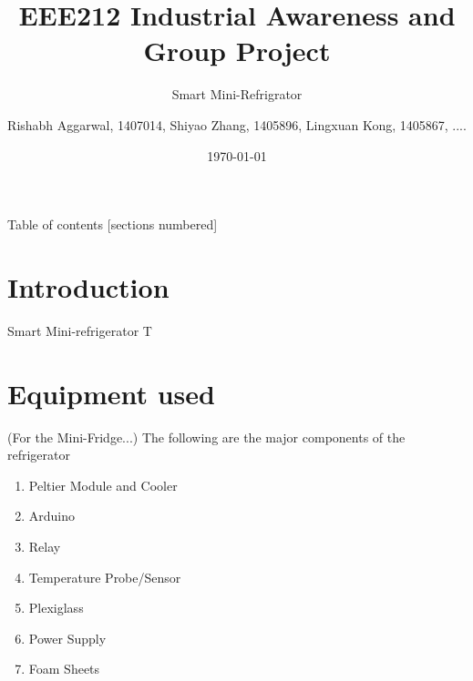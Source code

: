 \documentclass[10pt]{beamer}
\title{EEE212 Industrial Awareness and Group Project}
\subtitle{Smart Mini-Refrigrator}
\date{\today}
\author{Rishabh Aggarwal, 1407014, Shiyao Zhang, 1405896, Lingxuan Kong, 1405867,  ....}
\institute{Department of Electrical and Electronics Engineering, XJTLU}
\begin{document}
\maketitle
{
\begin{frame}{Table of contents}
  [sections numbered]
  \tableofcontents[hideallsubsections]
\end{frame}
}
\section{Introduction}
{
\begin{frame}[fragile]{Smart Mini-refrigerator}
	T
\end{frame}
}


\section{Equipment used}
{	
	\begin{frame}(For the Mini-Fridge...)
	The following are the major components of the refrigerator
	\begin{enumerate}[<+- | alert@+>]
		\item Peltier Module and Cooler
		\item Arduino
		\item Relay
		\item Temperature Probe/Sensor
		\item Plexiglass
		\item Power Supply
		\item Foam Sheets
	\end{enumerate}
\end{frame}
}
\end{document}
